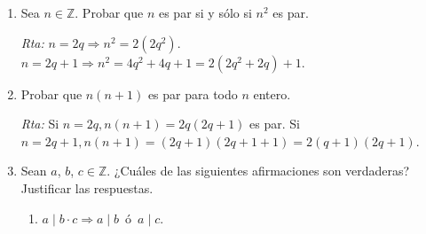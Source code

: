 \documentclass[a4paper,12pt,twoside,spanish,reqno]{amsbook}
\numberwithin{equation}{section}
\newcommand{\rta}{\noindent\textit{Rta: }}
\begin{document}
\begin{enumerate}
\begin{enumerate}
    \rta $0=2\times 0$ y $1=2\times 0+1$.
    
    \item  Si $b$ es par y \,$b \mid c$, entonces $c$ es par.  (Por lo tanto, si $b$ es par, tambi\'en lo es $-b$).
    
    \rta $b=2q, c=bp\Rightarrow c=2qp \Rightarrow c$ es par. ($b\vert -b$).
    
    \item  Si $b$ y $c$ son pares, entonces $b+c$ tambi\'en lo es. %
    
    \rta $2\vert b, 2\vert c \Rightarrow 2\vert b+c$.
    
    \item  Si un número par divide a 2, entonces ese número es 2\, \'o \,$-2$.
    
    \rta Dicho número $a$ no puede ser 0 y por el ejercicio 7 b) $2\vert a$ y $a\vert 2$ entonces $a= \pm2$.
    
    \item  La suma de un número par y uno impar es impar.
    
    \rta $a=2q, b=2p+1 \Rightarrow a+b=2(q+p)+1$.
    
    \item $b + c$ es par si y  sólo si $b$ y $c$ son ambos pares o ambos impares.
    
    \rta $b=2q, c=2p \Rightarrow b+c=2(q+p); b=2q+1, c=2p+1\Rightarrow b+c=2q+1+2p+1=2(q+p+1)$.
\end{enumerate}



\item Sea $n\in \mathbb Z$. Probar que $n$ es par si y s\'olo si $n^2$ es par.

\rta $n=2q \Rightarrow n^2=2(2q^2)$. $n=2q+1\Rightarrow n^2=4q^2+4q+1=2(2q^2+2q)+1$.



\item Probar que $n(n+1)$ es par para todo $n$ entero.

\rta Si $ n=2q, n(n+1)=2q(2q+1)$ es par. Si $n=2q+1, n(n+1)=(2q+1)(2q+1+1)=2(q+1)(2q+1)$.



\item Sean $a$, $b$, $c \in {\mathbb Z}$. ¿Cuáles de las siguientes afirmaciones son verdaderas? Justificar las respuestas.
\begin{enumerate}
    \item $a \mid b\cdot c \Rightarrow a \mid b$\, \'o \,$a \mid c$.
    

\end{enumerate}
\end{enumerate}
\end{document}
